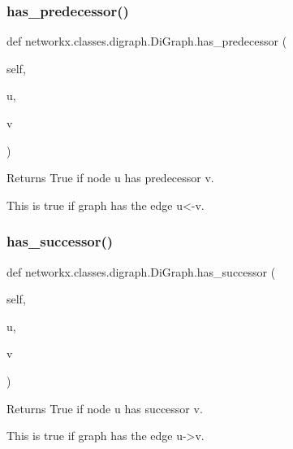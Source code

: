 \subsubsection{\texorpdfstring{has\+\_\+predecessor()}{has\_predecessor()}}
{\footnotesize\ttfamily def networkx.\+classes.\+digraph.\+Di\+Graph.\+has\+\_\+predecessor (\begin{DoxyParamCaption}\item[{}]{self,  }\item[{}]{u,  }\item[{}]{v }\end{DoxyParamCaption})}

\begin{DoxyVerb}Returns True if node u has predecessor v.

This is true if graph has the edge u<-v.
\end{DoxyVerb}
 \mbox{\label{classnetworkx_1_1classes_1_1digraph_1_1DiGraph_a674428bd3e3d53f26ebaa456a669cd42}} 
\subsubsection{\texorpdfstring{has\+\_\+successor()}{has\_successor()}}
{\footnotesize\ttfamily def networkx.\+classes.\+digraph.\+Di\+Graph.\+has\+\_\+successor (\begin{DoxyParamCaption}\item[{}]{self,  }\item[{}]{u,  }\item[{}]{v }\end{DoxyParamCaption})}

\begin{DoxyVerb}Returns True if node u has successor v.

This is true if graph has the edge u->v.
\end{DoxyVerb}
 \mbox{\label{classnetworkx_1_1classes_1_1digraph_1_1DiGraph_a95ec1bf606ee36aae19bf6d1a4b2b7bf}} 
